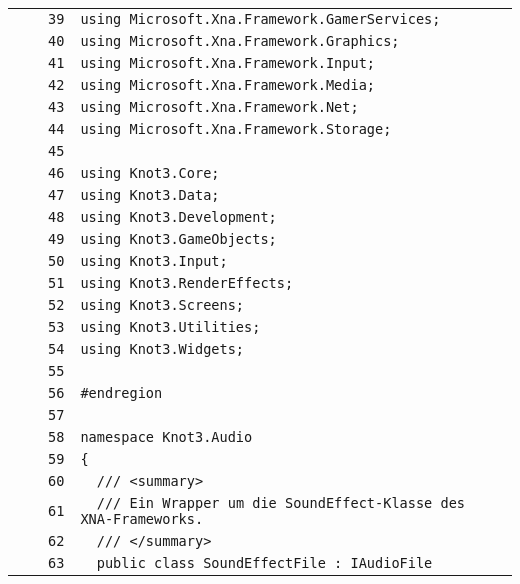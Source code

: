 \documentclass[a4paper,10pt]{article}
\begin{document}
\begin{longtable}[l]{lrrl}
\cellcolor{gray} &  & \verb~39~ & \verb~using Microsoft.Xna.Framework.GamerServices;~\\
\cellcolor{gray} &  & \verb~40~ & \verb~using Microsoft.Xna.Framework.Graphics;~\\
\cellcolor{gray} &  & \verb~41~ & \verb~using Microsoft.Xna.Framework.Input;~\\
\cellcolor{gray} &  & \verb~42~ & \verb~using Microsoft.Xna.Framework.Media;~\\
\cellcolor{gray} &  & \verb~43~ & \verb~using Microsoft.Xna.Framework.Net;~\\
\cellcolor{gray} &  & \verb~44~ & \verb~using Microsoft.Xna.Framework.Storage;~\\
\cellcolor{gray} &  & \verb~45~ & \verb~~\\
\cellcolor{gray} &  & \verb~46~ & \verb~using Knot3.Core;~\\
\cellcolor{gray} &  & \verb~47~ & \verb~using Knot3.Data;~\\
\cellcolor{gray} &  & \verb~48~ & \verb~using Knot3.Development;~\\
\cellcolor{gray} &  & \verb~49~ & \verb~using Knot3.GameObjects;~\\
\cellcolor{gray} &  & \verb~50~ & \verb~using Knot3.Input;~\\
\cellcolor{gray} &  & \verb~51~ & \verb~using Knot3.RenderEffects;~\\
\cellcolor{gray} &  & \verb~52~ & \verb~using Knot3.Screens;~\\
\cellcolor{gray} &  & \verb~53~ & \verb~using Knot3.Utilities;~\\
\cellcolor{gray} &  & \verb~54~ & \verb~using Knot3.Widgets;~\\
\cellcolor{gray} &  & \verb~55~ & \verb~~\\
\cellcolor{gray} &  & \verb~56~ & \verb~#endregion~\\
\cellcolor{gray} &  & \verb~57~ & \verb~~\\
\cellcolor{gray} &  & \verb~58~ & \verb~namespace Knot3.Audio~\\
\cellcolor{gray} &  & \verb~59~ & \verb~{~\\
\cellcolor{gray} &  & \verb~60~ & \verb~  /// <summary>~\\
\cellcolor{gray} &  & \verb~61~ & \verb~  /// Ein Wrapper um die SoundEffect-Klasse des XNA-Frameworks.~\\
\cellcolor{gray} &  & \verb~62~ & \verb~  /// </summary>~\\
\cellcolor{gray} &  & \verb~63~ & \verb~  public class SoundEffectFile : IAudioFile~\\

\end{longtable}
\end{document}
